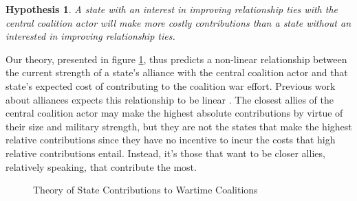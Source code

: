 \documentclass[12pt,letterpaper]{article}
\newtheorem{hyp}{Hypothesis}
\begin{document}
		\begin{hyp}
			A state with an interest in improving relationship ties with the central coalition actor will make more costly contributions than a state without an interested in improving relationship ties.
		\end{hyp}

		Our theory, presented in figure \ref{fig:theory}, thus predicts a non-linear relationship between the current strength of a state's alliance with the central coalition actor and that state's expected cost of contributing to the coalition war effort. Previous work about alliances expects this relationship to be linear \citep{massie_democraticalliesfollowership_2016, haesebrouck_explainingmemberstates_2016, ringsmose_natoburdensharingredux_2010}. The closest allies of the central coalition actor may make the highest absolute contributions by virtue of their size and military strength, but they are not the states that make the highest relative contributions since they have no incentive to incur the costs that high relative contributions entail. Instead, it's those that want to be closer allies, relatively speaking, that contribute the most.

			\begin{figure}[H]
				\centering
				\caption{Theory of State Contributions to Wartime Coalitions}
				\label{fig:theory}
			\end{figure}
\end{document}
